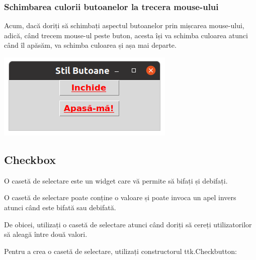 \documentclass[12pt,a4paper]{book}
\begin{document}
\subsubsection{Schimbarea culorii butoanelor la trecera mouse-ului }
Acum, dacă doriți să schimbați aspectul butoanelor prin mișcarea mouse-ului, adică, când trecem mouse-ul peste buton, acesta își va schimba culoarea atunci când îl apăsăm, va schimba culoarea și așa mai departe.

\includegraphics[width=\linewidth]{stilttkbuton03.png}

\subsection{Checkbox}
O casetă de selectare este un widget care vă permite să bifați și debifați.

 O casetă de selectare poate conține o valoare și poate invoca un apel invers atunci când este bifată sau debifată.

 De obicei, utilizați o casetă de selectare atunci când doriți să cereți utilizatorilor să aleagă între două valori.

 Pentru a crea o casetă de selectare, utilizați constructorul ttk.Checkbutton:
 
\end{document}
